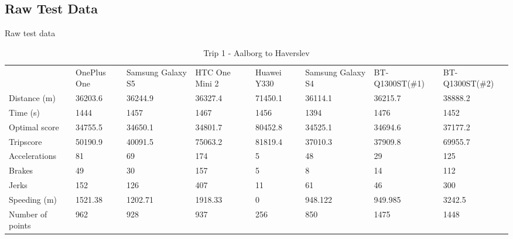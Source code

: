 \subsection*{Raw Test Data}
Raw test data
\begin{table*}[tb]
\centering
\caption{Trip 1 - Aalborg to Haverslev}
\label{my-label}
\begin{tabular}{llllllll}
                 & OnePlus One & Samsung Galaxy S5 & HTC One Mini 2 & Huawei Y330 & Samsung Galaxy S4 & BT-Q1300ST(\#1) & BT-Q1300ST(\#2) \\
Distance (m)     & 36203.6     & 36244.9           & 36327.4        & 71450.1     & 36114.1           & 36215.7         & 38888.2         \\
Time (s)         & 1444        & 1457              & 1467           & 1456        & 1394              & 1476            & 1452            \\
Optimal score    & 34755.5     & 34650.1           & 34801.7        & 80452.8     & 34525.1           & 34694.6         & 37177.2         \\
Tripscore        & 50190.9     & 40091.5           & 75063.2        & 81819.4     & 37010.3           & 37909.8         & 69955.7         \\
Accelerations    & 81          & 69                & 174            & 5           & 48                & 29              & 125             \\
Brakes           & 49          & 30                & 157            & 5           & 8                 & 14              & 112             \\
Jerks            & 152         & 126               & 407            & 11          & 61                & 46              & 300             \\
Speeding (m)     & 1521.38     & 1202.71           & 1918.33        & 0           & 948.122           & 949.985         & 3242.5          \\
Number of points & 962         & 928               & 937            & 256         & 850               & 1475            & 1448           
\end{tabular}
\end{table*}



